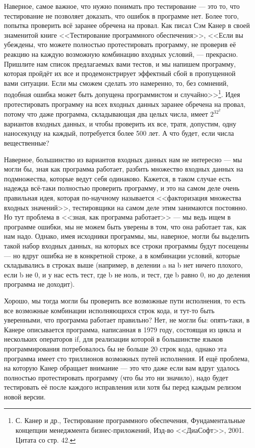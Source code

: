 \documentclass{../../text-style}
\begin{document}
Наверное, самое важное, что нужно понимать про тестирование --- это то, что тестирование не позволяет доказать, что ошибок в программе нет. Более того, попытка проверить всё заранее обречена на провал. Как писал Сэм Канер в своей знаменитой книге <<Тестирование программного обеспечения>>, <<Если вы убеждены, что можете полностью протестировать программу, не проверив её реакцию на каждую возможную комбинацию входных условий, --- прекрасно. Пришлите нам список предлагаемых вами тестов, и мы напишем программу, которая пройдёт их все и продемонстрирует эффектный сбой в пропущенной вами ситуации. Если мы сможем сделать это намеренно, то, без сомнений, подобная ошибка может быть допущена программистом и случайно>>\footnote{С. Канер и др., Тестирование программного обеспечения, Фундаментальные концепции менеджмента бизнес-приложений, Изд-во <<ДиаСофт>>, 2001. Цитата со стр. 42.}. Идея протестировать программу на всех входных данных заранее обречена на провал, потому что даже программа, складывающая два целых числа, имеет $2^{32^2}$ вариантов входных данных, и чтобы проверить их все, тратя, допустим, одну наносекунду на каждый, потребуется более 500 лет. А что будет, если числа вещественные?

Наверное, большинство из вариантов входных данных нам не интересно --- мы могли бы, зная как программа работает, разбить множество входных данных на подмножества, которые ведут себя одинаково. Кажется, в таком случае есть надежда всё-таки полностью проверить программу, и это на самом деле очень правильная идея, которая по-научному называется <<факторизация множества входных значений>>, тестировщики на самом деле этим занимаются постоянно. Но тут проблема в <<зная, как программа работает>> --- мы ведь ищем в программе ошибки, мы не можем быть уверены в том, что она работает так, как нам надо. Однако, имея исходники программы, мы, наверное, могли бы выделить такой набор входных данных, на которых все строки программы будут посещены --- но вдруг ошибка не в конкретной строке, а в комбинации условий, которые складывались в строках выше (например, в делении a на b нет ничего плохого, если b не 0, и у нас есть тест, где b не ноль, и тест, где b равно 0, но до деления программа не доходит).

Хорошо, мы тогда могли бы проверить все возможные пути исполнения, то есть все возможные комбинации исполняющихся строк кода, и тут-то быть уверенными, что программа работает правильно? Нет, не могли бы: опять-таки, в Канере описывается программа, написанная в 1979 году, состоящая из цикла и нескольких операторов if, для реализации которой в большинстве языков программирования потребовалось бы не больше 20 строк кода, однако эта программа имеет сто триллионов возможных путей исполнения. И ещё проблема, на которую Канер обращает внимание --- это что даже если вам вдруг удалось полностью протестировать программу (что бы это ни значило), надо будет тестировать её после каждого исправления или хотя бы перед каждым релизом новой версии.
\end{document}
